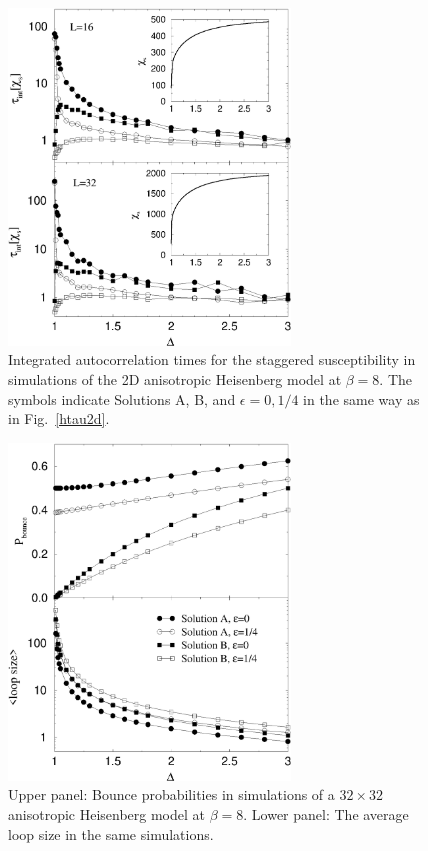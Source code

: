 \documentclass[10pt,pre,aps,twocolumn,showpacs,superscriptaddress,
floatfix]{revtex4}
\begin{document}
\begin{figure}
\includegraphics[clip,width=7.5cm]{fig20.eps}
\caption{Integrated autocorrelation times for the staggered susceptibility 
in simulations of the 2D anisotropic Heisenberg model at $\beta=8$. The 
symbols indicate Solutions A, B, and $\epsilon=0,1/4$ in the same way as in 
Fig.~\ref{htau2d}.}
\label{dtau2d}
\end{figure}

\begin{figure}
\includegraphics[clip,width=7.5cm]{fig21.eps}
\caption{Upper panel: Bounce probabilities in simulations of a $32\times 32$
anisotropic Heisenberg model at $\beta=8$. Lower panel: The average loop size
in the same simulations.}
\label{bounce2d}
\end{figure}
\end{document}
